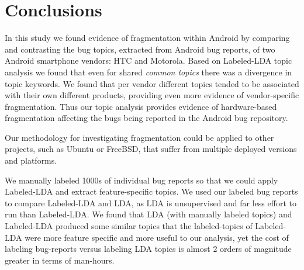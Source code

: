 \documentclass[10pt, conference, compsocconf]{IEEEtran}
\begin{document}
\section{Conclusions}
\label{sec:conclusions}

In this study we found evidence of fragmentation within Android by
comparing and contrasting the bug topics, extracted from  Android bug reports,
of 
two Android smartphone vendors: HTC and Motorola.
Based on Labeled-LDA topic analysis we found that even for shared \emph{common
topics} there was a divergence in topic keywords. We found that per vendor
different topics tended to be associated with their own different
products, providing even more evidence of vendor-specific fragmentation.
Thus our topic analysis provides evidence of hardware-based
fragmentation affecting the bugs being reported in the Android bug
repository.

Our methodology for investigating fragmentation could be applied to
other projects, such as Ubuntu or FreeBSD, that suffer from multiple
deployed versions and platforms.

We manually labeled 1000s of individual bug reports so that we could
apply Labeled-LDA and extract 
 feature-specific topics. We used our labeled bug reports to compare Labeled-LDA
and LDA, as LDA is unsupervised and far less effort to run than
Labeled-LDA.
We found that LDA (with manually labeled topics) and Labeled-LDA
produced some similar topics that the labeled-topics of Labeled-LDA were more
feature specific and more useful to our analysis, yet the cost of
labeling bug-reports versus labeling LDA topics is almost 2 orders of
magnitude greater in terms of man-hours.


\end{document}
